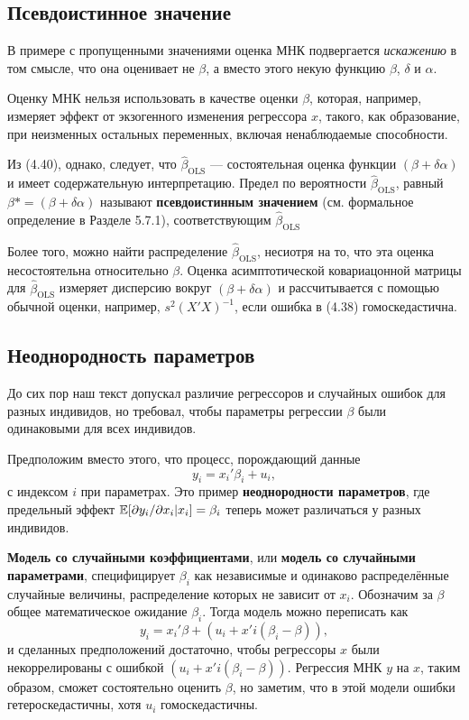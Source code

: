 \subsection{Псевдоистинное значение}
В примере с пропущенными значениями оценка МНК подвергается \textit{искажению} в том смысле, что она оценивает не $\beta$, а вместо этого некую функцию $\beta$, $\delta$ и $\alpha$. 

Оценку МНК нельзя использовать в качестве оценки $\beta$, которая, например, измеряет эффект от экзогенного изменения регрессора $x$, такого, как образование, при неизменных остальных переменных, включая ненаблюдаемые способности.

Из (4.40), однако, следует, что $\hat{\beta}_{\text{OLS}}$ --- состоятельная оценка функции $(\beta +\delta \alpha)$ и имеет содержательную интерпретацию. Предел по вероятности $\hat{\beta}_{\text{OLS}}$, равный $\beta{*} = (\beta +\delta \alpha)$ называют \textbf{псевдоистинным значением} (см. формальное определение в Разделе 5.7.1), соответствующим $\hat{\beta}_{\text{OLS}}$

Более того, можно найти распределение $\hat{\beta}_{\text{OLS}}$, несиотря на то, что эта оценка несостоятельна относительно $\beta$. Оценка асимптотической ковариацонной матрицы для $\hat{\beta}_{\text{OLS}}$ измеряет дисперсию вокруг $(\beta +\delta \alpha)$ и рассчитывается с помощью обычной оценки, например, $s^2 (X'X)^{-1}$, если ошибка в (4.38) гомоскедастична.

\subsection{Неоднородность параметров}
До сих пор наш текст допускал различие регрессоров и случайных ошибок для разных индивидов, но требовал, чтобы параметры регрессии $\beta$ были одинаковыми для всех индивидов. 

Предположим вместо этого, что процесс, порождающий данные
\begin{equation}
y_i = x_i'\beta_i + u_i, 
\end{equation}
с индексом $i$ при параметрах. Это пример \textbf{неоднородности параметров}, где предельный эффект $\mathbb{E}[\partial y_i/\partial x_i| x_i]=\beta_i$ теперь может различаться у разных индивидов.

\textbf{Модель со случайными коэффициентами}, или \textbf{модель со случайными параметрами}, специфицирует $\beta_i$ как независимые и одинаково распределённые случайные величины, распределение которых не зависит от $x_i$. Обозначим за $\beta$ общее математическое ожидание $\beta_i$. Тогда модель можно переписать как 
$$
y_i = x_i'\beta + (u_i +x'i(\beta_i -\beta)),
$$
и сделанных предположений достаточно, чтобы регрессоры $x$ были некоррелированы с ошибкой $(u_i +x'i(\beta_i -\beta))$. Регрессия МНК $y$ на $x$, таким образом, сможет состоятельно оценить $\beta$, но заметим, что в этой модели ошибки гетероскедастичны, хотя $u_i$ гомоскедастичны.

